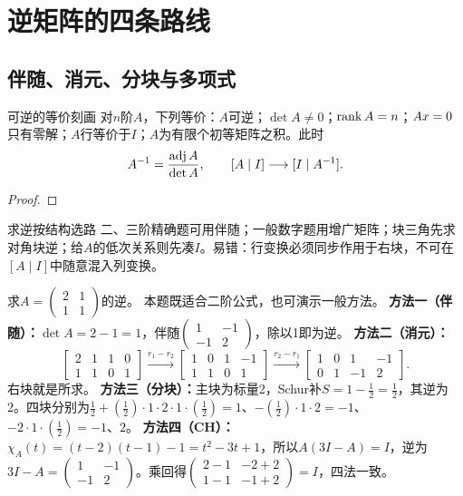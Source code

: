 \section{逆矩阵的四条路线}
\subsection{伴随、消元、分块与多项式}
\begin{theorem}{可逆的等价刻画}
对$n$阶$A$，下列等价：$A$可逆；$\det A\ne0$；$\operatorname{rank} A=n$；$Ax=0$只有零解；$A$行等价于$I$；$A$为有限个初等矩阵之积。此时
\begin{equation}A^{-1}=\dfrac{\operatorname{adj} A}{\det A},\qquad [A\mid I]\longrightarrow[I\mid A^{-1}].\end{equation}
\end{theorem}
\begin{proof}

\end{proof}
\begin{method}{求逆按结构选路}
二、三阶精确题可用伴随；一般数字题用增广矩阵；块三角先求对角块逆；给$A$的低次关系则先凑$I$。易错：行变换必须同步作用于右块，不可在$[A\mid I]$中随意混入列变换。
\end{method}
{求$A=\begin{pmatrix}2&1\\1&1\end{pmatrix}$的逆。}
{本题既适合二阶公式，也可演示一般方法。}
{\textbf{方法一（伴随）：}$\det A=2-1=1$，伴随$\begin{pmatrix}1&-1\\-1&2\end{pmatrix}$，除以1即为逆。
\textbf{方法二（消元）：}
\[\left[\begin{array}{cc|cc}2&1&1&0\\1&1&0&1\end{array}\right]
\xrightarrow{r_1-r_2}\left[\begin{array}{cc|cc}1&0&1&-1\\1&1&0&1\end{array}\right]
\xrightarrow{r_2-r_1}\left[\begin{array}{cc|cc}1&0&1&-1\\0&1&-1&2\end{array}\right].\]
右块就是所求。
\textbf{方法三（分块）：}主块为标量2，Schur补$S=1-\frac{1}{2}=\frac{1}{2}$，其逆为2。四块分别为$\frac{1}{2}+(\frac{1}{2})\cdot1\cdot2\cdot1\cdot(\frac{1}{2})=1$、$-(\frac{1}{2})\cdot1\cdot2=-1$、$-2\cdot1\cdot(\frac{1}{2})=-1$、$2$。
\textbf{方法四（CH）：}$\chi_A(t)=(t-2)(t-1)-1=t^2-3t+1$，所以$A(3I-A)=I$，逆为$3I-A=\begin{pmatrix}1&-1\\-1&2\end{pmatrix}$。乘回得$\begin{pmatrix}2-1&-2+2\\1-1&-1+2\end{pmatrix}=I$，四法一致。}
